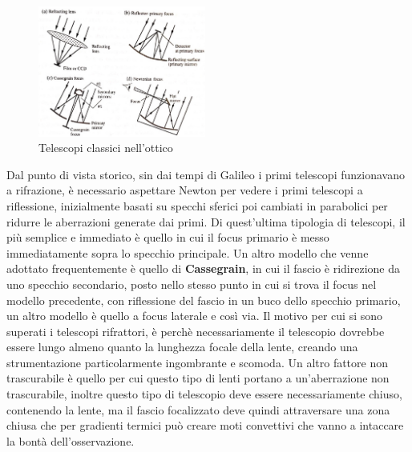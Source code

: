 \documentclass[a4paper,twoside,openany,notitlepage]{book}
\theoremstyle{definition}
\theoremstyle{plain}
\begin{document}
\begin{figure}
	\vspace{-10pt}
	\centering
	\includegraphics[width=0.49\textwidth]{./Immagini/Capitolo2/Telescopi_classici.png}
	\caption*{Telescopi classici nell'ottico}
	\vspace{-10pt}
\end{figure}

Dal punto di vista storico, sin dai tempi di Galileo i primi telescopi funzionavano a rifrazione, è necessario aspettare Newton per vedere i primi telescopi a riflessione, inizialmente basati su specchi sferici poi cambiati in parabolici per ridurre le aberrazioni generate dai primi. Di quest'ultima tipologia di telescopi, il più semplice e immediato è quello in cui il focus primario è messo immediatamente sopra lo specchio principale. Un altro modello che venne adottato frequentemente è quello di \textbf{Cassegrain}, in cui il fascio è ridirezione da uno specchio secondario, posto nello stesso punto in cui si trova il focus nel modello precedente, con riflessione del fascio in un buco dello specchio primario, un altro modello è quello a focus laterale e così via. Il motivo per cui si sono superati i telescopi rifrattori, è perchè necessariamente il telescopio dovrebbe essere lungo almeno quanto la lunghezza focale della lente, creando una strumentazione particolarmente ingombrante e scomoda. Un altro fattore non trascurabile è quello per cui questo tipo di lenti portano a un'aberrazione non trascurabile, inoltre questo tipo di telescopio deve essere necessariamente chiuso, contenendo la lente, ma il fascio focalizzato deve quindi attraversare una zona chiusa che per gradienti termici può creare moti convettivi che vanno a intaccare la bontà dell'osservazione.
\end{document}
